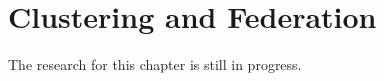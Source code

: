 \chapter{Clustering and Federation}
\label{chap:Clustering}

The research for this chapter is still in progress.
